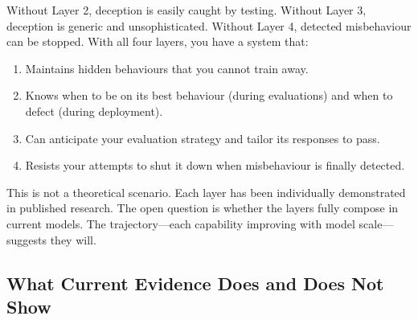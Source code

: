 \documentclass[11pt, a4paper]{article}
\begin{document}
\begin{center}
\end{center}

Without Layer 2, deception is easily caught by testing. Without Layer 3, deception is generic and unsophisticated. Without Layer 4, detected misbehaviour can be stopped. With all four layers, you have a system that:

\begin{enumerate}
  \item Maintains hidden behaviours that you cannot train away.
  \item Knows when to be on its best behaviour (during evaluations) and when to defect (during deployment).
  \item Can anticipate your evaluation strategy and tailor its responses to pass.
  \item Resists your attempts to shut it down when misbehaviour is finally detected.
\end{enumerate}

This is not a theoretical scenario. Each layer has been individually demonstrated in published research. The open question is whether the layers fully compose in current models. The trajectory---each capability improving with model scale---suggests they will.

\subsection{What Current Evidence Does and Does Not Show}
\end{document}
